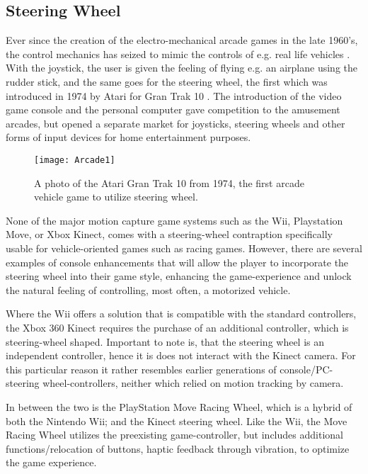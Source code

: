 \subsection{Steering Wheel}
Ever since the creation of the electro-mechanical arcade games in the late 1960's, the control mechanics has seized to mimic the controls of e.g. real life vehicles \parencite{Herz1997}. With the joystick, the user is given the feeling of flying e.g. an airplane using the rudder stick, and the same goes for the steering wheel, the first which was introduced in 1974 by Atari for Gran Trak 10 \parencite{Kohler2005}. The introduction of the video game console and the personal computer gave competition to the amusement arcades, but opened a separate market for joysticks, steering wheels and other forms of input devices for home entertainment purposes\parencite{Herz1997}. 

\begin{figure}[!htbp] 
\centering
\texttt{[image: Arcade1]} 
\caption{A photo of the Atari Gran Trak 10 from 1974, the first arcade vehicle game to utilize steering wheel. }
\label{fig:Arcade}
\end{figure}
\bigskip

None of the major motion capture game systems such as the Wii, Playstation Move, or Xbox Kinect, comes with a steering-wheel contraption specifically usable for vehicle-oriented games such as racing games. However, there are several examples of console enhancements that will allow the player to incorporate the steering wheel into their game style, enhancing the game-experience and unlock the natural feeling of controlling, most often, a motorized vehicle\parencite{Herz1997}.
\bigskip

Where the Wii offers a solution that is compatible with the standard controllers, the Xbox 360 Kinect requires the purchase of an additional controller, which is steering-wheel shaped. Important to note is, that the steering wheel is an independent controller, hence it is does not interact with the Kinect camera. For this particular reason it rather resembles earlier generations of console/PC-steering wheel-controllers, neither which relied on motion tracking by camera.
\bigskip

In between the two is the PlayStation Move Racing Wheel, which is a hybrid of both the Nintendo Wii; and the Kinect steering wheel. Like the Wii, the Move Racing Wheel utilizes the preexisting game-controller, but includes additional functions/relocation of buttons, haptic feedback through vibration, to optimize the game experience.


